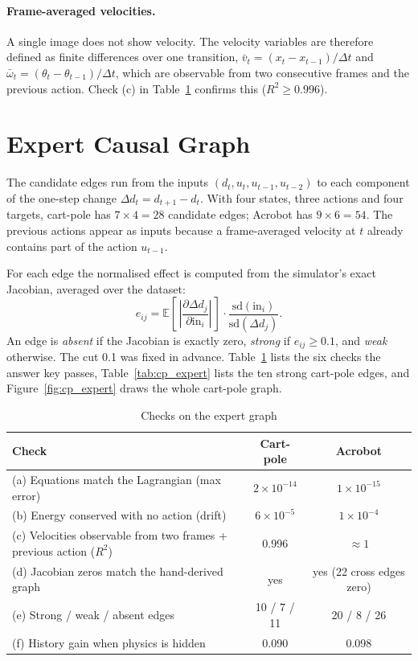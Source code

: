 \documentclass[11pt, a4paper, oneside,enumerate,textcomp]{report}
\newcommand{\vb}{\bar{v}}
\newcommand{\wb}{\bar{\omega}}
\newcommand{\dd}{\Delta}
\newcommand{\Rsq}{R^2}
\begin{document}
\paragraph{Frame-averaged velocities.} A single image does not show velocity. The velocity variables are therefore defined as finite differences over one transition, $\vb_t = (x_t - x_{t-1})/\Delta t$ and $\wb_t = (\theta_t - \theta_{t-1})/\Delta t$, which are observable from two consecutive frames and the previous action. Check (c) in Table~\ref{tab:checks} confirms this ($\Rsq \geq 0.996$).

\section{Expert Causal Graph}

The candidate edges run from the inputs $(d_t, u_t, u_{t-1}, u_{t-2})$ to each component of the one-step change $\dd d_t = d_{t+1} - d_t$. With four states, three actions and four targets, cart-pole has $7 \times 4 = 28$ candidate edges; Acrobot has $9 \times 6 = 54$. The previous actions appear as inputs because a frame-averaged velocity at $t$ already contains part of the action $u_{t-1}$.

For each edge the normalised effect is computed from the simulator's exact Jacobian, averaged over the dataset:
\begin{equation}
e_{ij} = \mathbb{E}\left[\,\left|\frac{\partial \dd d_j}{\partial \text{in}_i}\right|\,\right] \cdot \frac{\mathrm{sd}(\text{in}_i)}{\mathrm{sd}(\dd d_j)}.
\label{eq:effect}
\end{equation}
An edge is \emph{absent} if the Jacobian is exactly zero, \emph{strong} if $e_{ij} \geq 0.1$, and \emph{weak} otherwise. The cut 0.1 was fixed in advance. Table~\ref{tab:checks} lists the six checks the answer key passes, Table~\ref{tab:cp_expert} lists the ten strong cart-pole edges, and Figure~\ref{fig:cp_expert} draws the whole cart-pole graph.

\begin{table}[htbp]
\caption{Checks on the expert graph}
\centering
\small
\begin{tabular}{| p{6.8cm} | c | c |}
\hline
\textbf{Check} & \textbf{Cart-pole} & \textbf{Acrobot} \\
\hline
(a) Equations match the Lagrangian (max error) & $2\times10^{-14}$ & $1\times10^{-15}$ \\
\hline
(b) Energy conserved with no action (drift) & $6\times10^{-5}$ & $1\times10^{-4}$ \\
\hline
(c) Velocities observable from two frames + previous action ($\Rsq$) & 0.996 & $\approx 1$ \\
\hline
(d) Jacobian zeros match the hand-derived graph & yes & yes (22 cross edges zero) \\
\hline
(e) Strong / weak / absent edges & 10 / 7 / 11 & 20 / 8 / 26 \\
\hline
(f) History gain when physics is hidden & 0.090 & 0.098 \\
\hline
\end{tabular}
\label{tab:checks}
\end{table}
\end{document}
